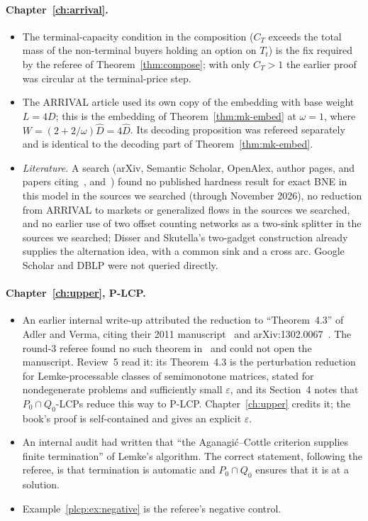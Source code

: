 \paragraph{Chapter~\ref{ch:arrival}.}
\begin{itemize}[nosep]
\item The terminal-capacity condition in the composition ($C_T$ exceeds the total mass of the
non-terminal buyers holding an option on $T_t$) is the fix required by the referee of
Theorem~\ref{thm:compose}; with only $C_T>1$ the earlier proof was circular at the terminal-price step.
\item The ARRIVAL article used its own copy of the embedding with base weight $L=4D$; this is the
embedding of Theorem~\ref{thm:mk-embed} at $\omega=1$, where $W=(2+2/\omega)\hat D=4\hat D$. Its
decoding proposition was refereed separately and is identical to the decoding part of
Theorem~\ref{thm:mk-embed}.
\item \emph{Literature.} A search (arXiv, Semantic Scholar, OpenAlex, author pages, and papers
citing~\cite{lck16}, \cite{haslebacher25} and~\cite{conitzer26}) found no published hardness result for exact BNE in this model in the sources we searched (through November 2026), no reduction from ARRIVAL to markets or generalized flows in the sources we searched, and no earlier use of two offset counting networks as a two-sink splitter in the sources we searched; Disser and Skutella's two-gadget construction already supplies the alternation idea, with a common sink and a cross arc. Google Scholar and DBLP were not queried directly.
\end{itemize}

\paragraph{Chapter~\ref{ch:upper}, P-LCP.}
\begin{itemize}[nosep]
\item An earlier internal write-up attributed the reduction to ``Theorem~4.3'' of Adler and Verma, citing their 2011 manuscript~\cite{av11} and arXiv:1302.0067~\cite{av13}. The round-3 referee found no such theorem in~\cite{av13} and could not open the manuscript. Review~5 read it: its Theorem~4.3 is the perturbation reduction for Lemke-processable classes of semimonotone matrices, stated for nondegenerate problems and sufficiently small $\varepsilon$, and its Section~4 notes that $P_0\cap Q_0$-LCPs reduce this way to P-LCP. Chapter~\ref{ch:upper} credits it; the book's proof is self-contained and gives an explicit $\varepsilon$.
\item An internal audit had written that ``the Aganagi\'c--Cottle criterion supplies finite termination''
of Lemke's algorithm. The correct statement, following the referee, is that termination is automatic and
$P_0\cap Q_0$ ensures that it is at a solution.
\item Example~\ref{plcp:ex:negative} is the referee's negative control.
\end{itemize}

